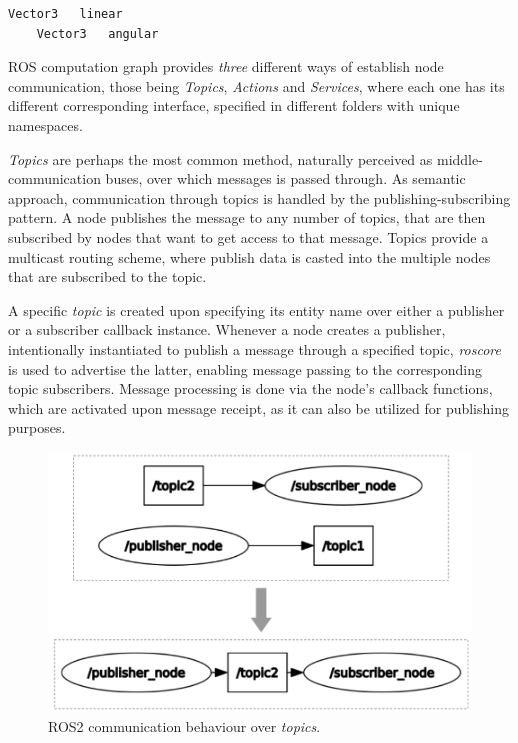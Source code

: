 \begin{lstlisting}[title={\texttt{Twist.msg} interface file that is used to trigger the turtle movement.}]
    Vector3   linear
    Vector3   angular
\end{lstlisting}

ROS computation graph provides \textit{three} different ways of establish node communication, those being \textit{Topics}, \textit{Actions} and \textit{Services}, where each one has its different corresponding interface, specified in different folders with unique namespaces. 



\textit{Topics} are perhaps the most common method, naturally perceived as middle-communication buses, over which messages is passed through. As semantic approach, communication through topics is handled by the publishing-subscribing pattern. A node publishes the message to any number of topics, that are then subscribed by nodes that want to get access to that message. Topics provide a multicast routing scheme, where publish data is casted into the multiple nodes that are subscribed to the topic. 

A specific \textit{topic} is created upon specifying its entity name over either a publisher or a subscriber callback instance. Whenever a node creates a publisher, intentionally instantiated to publish a message through a specified topic, \textit{roscore} is used to advertise the latter, enabling message passing to the corresponding topic subscribers. Message processing is done via the node's callback functions, which are activated upon message receipt, as it can also be utilized for publishing purposes. \cite{casini2019response} %

\begin{figure}[H]
        \centering
        \includegraphics[width=0.4\linewidth]{images/ros2-topics.png}
        \caption{ROS2 communication behaviour over \textit{topics}.}
        \label{fig:ros2-topics}
\end{figure}

